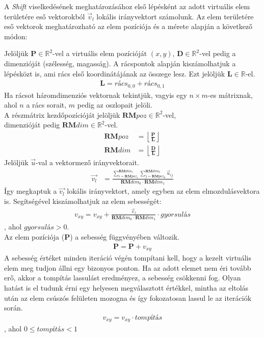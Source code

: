 A \textit{Shift} viselkedésének meghatározásához első lépésként az adott virtuális elem területére eső vektorokból $\vec{v}_l$  lokális irányvektort számolunk. Az elem területére eső vektorok meghatározható az elem pozíciója és a mérete alapján a következő módon:

Jelöljük $\boldsymbol P \in \mathbb{R}^2$-vel a virtuális elem pozícióját $(x,y)$, $\boldsymbol D \in \mathbb{R}^2$-vel pedig a dimenzióját (szélesség, magasság).
A rácspontok alapján kiszámolhatjuk a lépésközt is, ami rács első koordinátájának az összege lesz. Ezt jelöljük $\boldsymbol L \in \mathbb{R}$-el. 
\begin{align*}
	\boldsymbol L = \textit{rács}_{0,0} + \textit{rács}_{0,1}
\end{align*}
Ha rácsot háromdimenziós vektornak tekintjük, vagyis egy $n\times m$-es mátrixnak, ahol $n$ a rács sorait, $m$ pedig az oszlopait jelöli.\\
A részmátrix kezdőpozícióját jelöljük $\boldsymbol {RM}poz \in \mathbb{R}^2$-vel,\\
dimenzióját pedig $\boldsymbol {RM}dim \in \mathbb{R}^2$-vel.
\begin{align*}
	\boldsymbol {RM}poz &= \left\lfloor \frac{\boldsymbol P}{\boldsymbol L} \right\rfloor\\
	\boldsymbol {RM}dim &= \left\lfloor \frac{\boldsymbol D}{\boldsymbol L} \right\rfloor
\end{align*}
Jelöljük $\vec{u}$-val a vektormező irányvektorait.
\begin{align*}
  \vec{v_l} &= \frac{\sum_{i=\boldsymbol {RM}poz_1}^{\boldsymbol {RM}dim_1} \sum_{j=\boldsymbol {RM}poz_0}^{\boldsymbol {RM}dim_0} \vec{u}_{ij}}{\boldsymbol {RM}dim_0 \cdot \boldsymbol {RM}dim_1}
\end{align*}
Így megkaptuk a $\vec{v_l}$ lokális irányvektort, amely egyben az elem elmozdulásvektora is. Segítségével kiszámolhatjuk az elem sebességét:
\begin{align*}
  v_{xy} = v_{xy} + \frac{\vec{v}_l}{\boldsymbol {RM}dim_0 \cdot \boldsymbol {RM}dim_1} \cdot \textit{gyorsulás}
\end{align*}
, ahol $\textit{gyorsulás} > 0$.\\
Az elem pozíciója ($\boldsymbol P$) a sebesség függvényében változik.
\begin{align*}
  \boldsymbol P = \boldsymbol P+v_{xy}
\end{align*}
A sebesség értéket minden iteráció végén tompítani kell, hogy a kezelt virtuális elem meg tudjon állni egy bizonyos ponton. Ha az adott elemet nem éri tovább erő, akkor a tompítás lassulást eredményez, a sebesség csökkenni fog. Olyan hatást is el tudunk érni egy helyesen megválasztott értékkel, mintha az eltolás után az elem csúszós felületen mozogna és így fokozatosan lassul le az iterációk során.
\begin{align*}
  v_{xy} = v_{xy} \cdot \textit{tompítás}
\end{align*}
, ahol $0 \leq \textit{tompítás} < 1$

